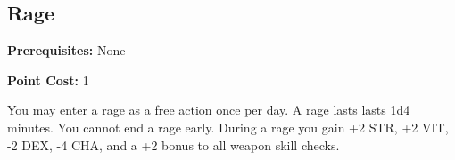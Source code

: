 \subsection{Rage}\label{feat:rage}

\noindent
\textbf{Prerequisites:} None

\noindent
\textbf{Point Cost:} 1 

You may enter a rage as a free action once per day. A rage lasts lasts 1d4 minutes. You
cannot end a rage early. During a rage you gain +2 STR, +2 VIT, -2 DEX, -4 CHA,
and a +2 bonus to all weapon skill checks.

